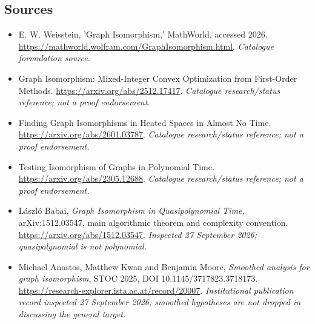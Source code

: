 \documentclass[11pt,a4paper]{article}
\numberwithin{equation}{section}
\begin{document}
\subsection{Sources}
\begin{itemize}\raggedright
\item[\textnormal{[S1]}]\hypertarget{source:statement:1}{} E. W. Weisstein, 'Graph Isomorphism,' MathWorld, accessed 2026.
\url{https://mathworld.wolfram.com/GraphIsomorphism.html}.
{\small\textit{Catalogue formulation source.}}
\item[\textnormal{[S2]}]\hypertarget{source:statement:2}{} Graph Isomorphism: Mixed-Integer Convex Optimization from First-Order Methods.
\url{https://arxiv.org/abs/2512.17417}.
{\small\textit{Catalogue research/status reference; not a proof endorsement.}}
\item[\textnormal{[S3]}]\hypertarget{source:statement:3}{} Finding Graph Isomorphisms in Heated Spaces in Almost No Time.
\url{https://arxiv.org/abs/2601.03787}.
{\small\textit{Catalogue research/status reference; not a proof endorsement.}}
\item[\textnormal{[S4]}]\hypertarget{source:statement:4}{} Testing Isomorphism of Graphs in Polynomial Time.
\url{https://arxiv.org/abs/2305.12688}.
{\small\textit{Catalogue research/status reference; not a proof endorsement.}}
\item[\textnormal{[E1]}]\hypertarget{extra:statement:1}{} L\'aszl\'o Babai,
\emph{Graph Isomorphism in Quasipolynomial Time}, arXiv:1512.03547,
main algorithmic theorem and complexity convention.
\url{https://arxiv.org/abs/1512.03547}.
{\small\textit{Inspected 27 September 2026; quasipolynomial is not polynomial.}}
\item[\textnormal{[E2]}]\hypertarget{extra:statement:2}{} Michael Anastos,
Matthew Kwan and Benjamin Moore, \emph{Smoothed analysis for graph isomorphism},
STOC 2025, DOI 10.1145/3717823.3718173.
\url{https://research-explorer.ista.ac.at/record/20007}.
{\small\textit{Institutional publication record inspected 27 September
2026; smoothed hypotheses are not dropped in discussing the general target.}}
\end{itemize}
\end{document}
